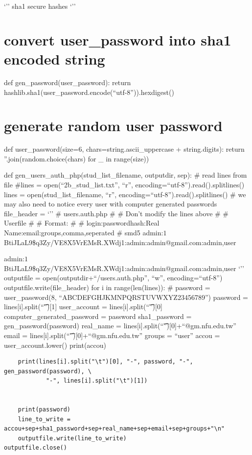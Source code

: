 \documentclass[]{article}
\begin{document}
`'' sha1 secure hashes `''

\section{convert user\_password into sha1 encoded
string}\label{convert-userux5fpassword-into-sha1-encoded-string}

def gen\_password(user\_password): return
hashlib.sha1(user\_password.encode(``utf-8'')).hexdigest()

\section{generate random user
password}\label{generate-random-user-password}

def user\_password(size=6, chars=string.ascii\_uppercase +
string.digits): return ''.join(random.choice(chars) for \_ in
range(size))

def gen\_users\_auth\_php(stud\_list\_filename, outputdir, sep): \# read
lines from file \#lines = open(``2b\_stud\_list.txt'', ``r'',
encoding=``utf-8'').read().splitlines() lines =
open(stud\_list\_filename, ``r'',
encoding=``utf-8'').read().splitlines() \# we may also need to notice
every user with computer generated passwords file\_header = `'' \#
users.auth.php \# \# Don't modify the lines above \# \# Userfile \# \#
Format: \# \# login:passwordhash:Real Name:email:groups,comma,seperated
\# smd5
admin:$1$BtiJLaL9\$q3Zy/VE8X5VrEMsR.XWdj1:admin:admin@gmail.com:admin,user

admin:$1$BtiJLaL9\$q3Zy/VE8X5VrEMsR.XWdj1:admin:admin@gmail.com:admin,user
`'' outputfile = open(outputdir+``/users.auth.php'', ``w'',
encoding=``utf-8'') outputfile.write(file\_header) for i in
range(len(lines)): \# password = user\_password(8,
``ABCDEFGHJKMNPQRSTUVWXYZ23456789'') password =
lines{[}i{]}.split(``\t''){[}1{]} user\_account =
lines{[}i{]}.split(``\t''){[}0{]} computer\_generated\_password =
password sha1\_password = gen\_password(password) real\_name =
lines{[}i{]}.split(``\t''){[}0{]}+``@gm.nfu.edu.tw'' email =
lines{[}i{]}.split(``\t''){[}0{]}+``@gm.nfu.edu.tw'' groups = ``user''
accou = user\_account.lower() print(accou)

\begin{verbatim}
    print(lines[i].split("\t")[0], "-", password, "-", gen_password(password), \
            "-", lines[i].split("\t")[1])
            

    print(password)
    line_to_write = accou+sep+sha1_password+sep+real_name+sep+email+sep+groups+"\n"
    outputfile.write(line_to_write)
outputfile.close()
\end{verbatim}
\end{document}
